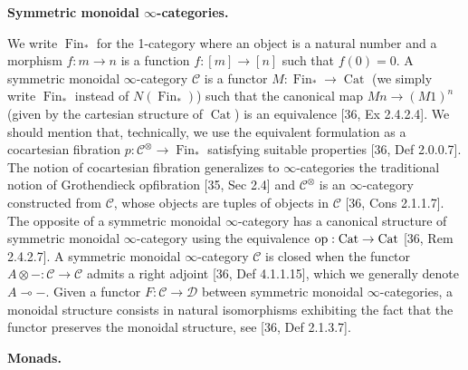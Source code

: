 \par\medskip\noindent\textbf{Symmetric monoidal $\infty$-categories.}\par
 
 
We write $\operatorname{Fin}_{\ast}$ for the 1-category where an object is a natural number and a morphism $f:m\to n$ is a function $f:[m]\to[n]$ such that $f(0)=0$. A symmetric monoidal $\infty$-category $\mathcal{C}$ is a functor $M:\operatorname{Fin}_{\ast}\to\operatorname{Cat}$ (we simply write $\operatorname{Fin}_{\ast}$ instead of $N(\operatorname{Fin}_{\ast})$) such that the canonical map $Mn\to(M1)^{n}$ (given by the cartesian structure of $\operatorname{Cat}$) is an equivalence [36, Ex 2.4.2.4]. We should mention that, technically, we use the equivalent formulation as a cocartesian fibration $p:\mathcal{C}^{\otimes}\to\operatorname{Fin}_{\ast}$ satisfying suitable properties [36, Def 2.0.0.7]. The notion of cocartesian fibration generalizes to $\infty$-categories the traditional notion of Grothendieck opfibration [35, Sec 2.4] and $\mathcal{C}^{\otimes}$ is an $\infty$-category constructed from $\mathcal{C}$, whose objects are tuples of objects in $\mathcal{C}$ [36, Cons 2.1.1.7]. The opposite of a symmetric monoidal $\infty$-category has a canonical structure of symmetric monoidal $\infty$-category using the equivalence $\textnormal{op}:\operatorname{Cat}\to\operatorname{Cat}$ [36, Rem 2.4.2.7]. A symmetric monoidal $\infty$-category $\mathcal{C}$ is closed when the functor $A\otimes-:\mathcal{C}\to\mathcal{C}$ admits a right adjoint [36, Def 4.1.1.15], which we generally denote $A\multimap-$. Given a functor $F:\mathcal{C}\to\mathcal{D}$ between symmetric monoidal $\infty$-categories, a monoidal structure consists in natural isomorphisms exhibiting the fact that the functor preserves the monoidal structure, see [36, Def 2.1.3.7].\par
 
 
 
 
\par\medskip\noindent\textbf{Monads.}\par
 
 
